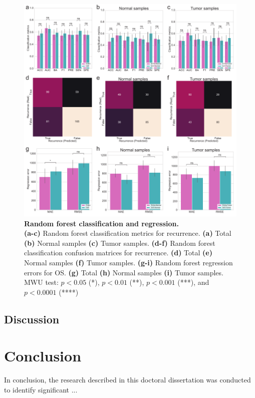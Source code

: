 \documentclass[11pt, a4paper, onecolumn, oneside]{report}
\begin{document}
            \begin{figure}[p]
                \centering
                \includegraphics[width=\linewidth]{Figures/CRC/Figure_10.pdf}
                \caption[Random forest classification and regression]{\textbf{Random forest classification and regression.}\\
                    \textbf{(a-c)} Random forest classification metrics for recurrence. \textbf{(a)} Total \textbf{(b)} Normal samples \textbf{(c)} Tumor samples. \textbf{(d-f)} Random forest classification confusion matrices for recurrence. \textbf{(d)} Total \textbf{(e)} Normal  samples \textbf{(f)} Tumor samples. \textbf{(g-i)} Random forest regression errors for OS. \textbf{(g)} Total \textbf{(h)} Normal samples \textbf{(i)} Tumor samples. MWU test: $p < 0.05$ (*), $p < 0.01$ (**), $p < 0.001$ (***), and $p < 0.0001$ (****)}
                \label{fig:CRC-ML}
            \end{figure}
            \clearpage
        \clearpage

        \subsection{Discussion}
        \clearpage
    \newpage

    \section{Conclusion}
        \label{section:conclusion}
        In conclusion, the research described in this doctoral dissertation was conducted to identify significant ...
\end{document}
